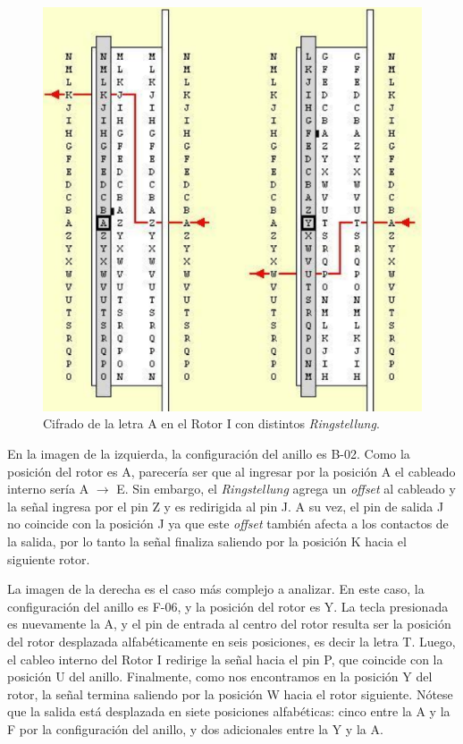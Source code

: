 \documentclass[a4paper,10pt]{article}
\begin{document}
\begin{figure}[H]
    \centering
    \includegraphics[scale=0.4]{rotor-ejs-2.png}
    \caption{Cifrado de la letra A en el Rotor I con distintos \textit{Ringstellung}.\cite{rijmenants}}
    \label{fig:my_label}
\end{figure}

En la imagen de la izquierda, la configuración del anillo es B-02. Como la posición del rotor es A, parecería ser que al ingresar por la posición A el cableado interno sería A $\rightarrow$ E. Sin embargo, el \textit{Ringstellung} agrega un \textit{offset} al cableado y la señal ingresa por el pin Z y es redirigida al pin J. A su vez, el pin de salida J no coincide con la posición J ya que este \textit{offset} también afecta a los contactos de la salida, por lo tanto la señal finaliza saliendo por la posición K hacia el siguiente rotor. 

La imagen de la derecha es el caso más complejo a analizar. En este caso, la configuración del anillo es F-06, y la posición del rotor es Y. La tecla presionada es nuevamente la A, y el pin de entrada al centro del rotor resulta ser la posición del rotor desplazada alfabéticamente en seis posiciones, es decir la letra T. Luego, el cableo interno del Rotor I redirige la señal hacia el pin P, que coincide con la posición U del anillo. Finalmente, como nos encontramos en la posición Y del rotor, la señal termina saliendo por la posición W hacia el rotor siguiente. Nótese que la salida está desplazada en siete posiciones alfabéticas: cinco entre la A y la F por la configuración del anillo, y dos adicionales entre la Y y la A. 
\end{document}
